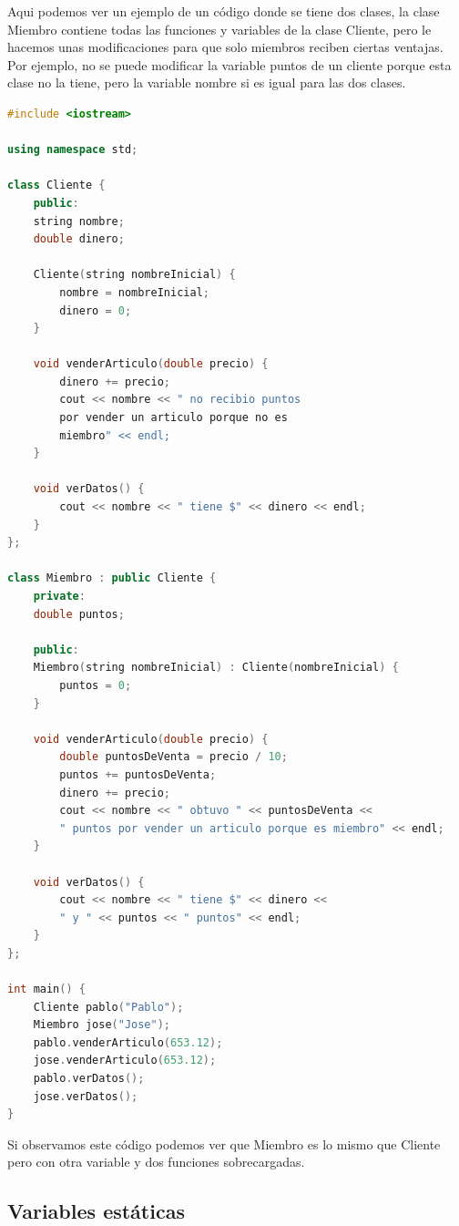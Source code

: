 \documentclass{article}
\begin{document}
Aqui podemos ver un ejemplo de un código donde se tiene dos clases, la clase Miembro contiene todas las funciones y variables de la clase Cliente, pero le hacemos unas modificaciones para que solo miembros reciben ciertas ventajas. Por ejemplo, no se puede modificar la variable puntos de un cliente porque esta clase no la tiene, pero la variable nombre si es igual para las dos clases.

\begin{lstlisting}[language=C++, caption=Heredación]
#include <iostream>

using namespace std;

class Cliente {
	public:
    string nombre;
    double dinero;

    Cliente(string nombreInicial) {
        nombre = nombreInicial;
        dinero = 0;
    }

    void venderArticulo(double precio) {
        dinero += precio;
        cout << nombre << " no recibio puntos
        por vender un articulo porque no es
        miembro" << endl;
    }

    void verDatos() {
        cout << nombre << " tiene $" << dinero << endl;
    }
};

class Miembro : public Cliente {
	private:
    double puntos;

	public:
    Miembro(string nombreInicial) : Cliente(nombreInicial) {
        puntos = 0;
    }

    void venderArticulo(double precio) {
        double puntosDeVenta = precio / 10;
        puntos += puntosDeVenta;
        dinero += precio;
        cout << nombre << " obtuvo " << puntosDeVenta <<
        " puntos por vender un articulo porque es miembro" << endl;
    }

    void verDatos() {
        cout << nombre << " tiene $" << dinero <<
        " y " << puntos << " puntos" << endl;
    }
};

int main() {
	Cliente pablo("Pablo");
	Miembro jose("Jose");
	pablo.venderArticulo(653.12);
	jose.venderArticulo(653.12);
	pablo.verDatos();
	jose.verDatos();
}
\end{lstlisting}

Si observamos este código podemos ver que Miembro es lo mismo que Cliente pero con otra variable y dos funciones sobrecargadas.

\subsection{Variables estáticas}
\end{document}
